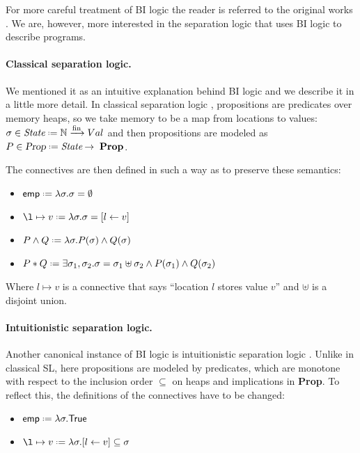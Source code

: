 For more careful treatment of BI logic the reader is referred to the original works \cite{ohearnLogicBunchedImplications1999, pymSemanticsProofTheory2002a}.
We are, however, more interested in the separation logic that uses BI logic to describe programs.

\paragraph{Classical separation logic.}
We mentioned it as an intuitive explanation behind BI logic and we describe it in a little more detail.
In classical separation logic \cite{ohearnLocalReasoningPrograms2001, reynoldsSeparationLogicLogic2002}, propositions are predicates over memory heaps, so we take memory to be a map from locations to values: \(\sigma \in \textit{State} \defeq \mathbb{N} \xrightarrow[]{\text{fin}} Val\) and then propositions are modeled as \(P \in \Prop \defeq \textit{State} \imp \textbf{Prop}\).

The connectives are then defined in such a way as to preserve these semantics:
\begin{itemize}
\item \(\emp \defeq \lambda \sigma. \sigma = \emptyset\)
\item \(\l \mapsto v \defeq \lambda \sigma. \sigma = [l \leftarrow v]\)
\item \(P \wedge Q \defeq \lambda \sigma. P (\sigma) \wedge Q (\sigma)\)
\item \(P \ast Q \defeq \exists \sigma_1, \sigma_2. \sigma = \sigma_1 \uplus \sigma_2 \wedge P(\sigma_1) \wedge Q(\sigma_2)\)
\end{itemize}

Where \(l \mapsto v\) is a connective that says ``location \(l\) stores value \(v\)'' and \(\uplus\) is a disjoint union.

\paragraph{Intuitionistic separation logic.}
Another canonical instance of BI logic is intuitionistic separation logic \cite{reynoldsIntuitionisticReasoningShared2000}.
Unlike in classical SL, here propositions are modeled by predicates, which are monotone with respect to the inclusion order \(\subseteq\) on heaps and implications in \textbf{Prop}.
To reflect this, the definitions of the connectives have to be changed:
\begin{itemize}
\item \(\emp \defeq \lambda \sigma. \True \)
\item \(\l \mapsto v \defeq \lambda \sigma. [l \leftarrow v] \subseteq \sigma \)
\end{itemize}

